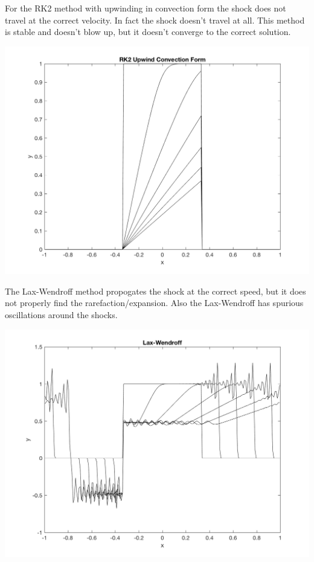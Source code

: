 \documentclass[11pt, oneside]{article}
\begin{document}
\begin{enumerate}
    For the RK2 method with upwinding in convection form the shock does
    not travel at the correct velocity.
    In fact the shock doesn't travel at all.
    This method is stable and doesn't blow up, but it doesn't converge to the
    correct solution.
    \begin{center}
      \includegraphics[scale=0.5]{Figures/08_14.png}
    \end{center}
    The Lax-Wendroff method propogates the shock at the correct speed, but it
    does not properly find the rarefaction/expansion.
    Also the Lax-Wendroff has spurious oscillations around the shocks.
    \begin{center}
      \includegraphics[scale=0.5]{Figures/08_15.png}
    \end{center}

\end{enumerate}
\end{document}

